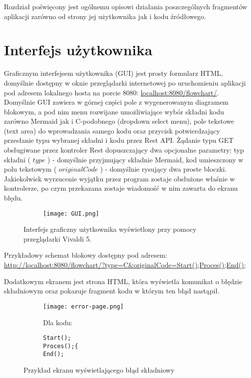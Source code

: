 	Rozdział poświęcony jest ogólnemu opisowi działania poszczególnych fragmentów aplikacji zarówno od strony jej użytkownika jak i kodu źródłowego.

\section{Interfejs użytkownika}
	Graficznym interfejsem użytkownika (GUI) jest prosty formularz HTML, domyślnie dostępny w oknie przeglądarki internetowej po uruchomieniu aplikacji pod adresem lokalnego hosta na porcie 8080: 
	\smallbreak
	\href{http://localhost:8080/flowchart/}{localhost:8080/flowchart/}.
	\bigbreak	
	Domyślnie GUI zawiera w górnej części pole z wygenerowanym diagramem blokowym, a pod nim  menu rozwijane umożliwiające wybór składni kodu zarówno Mermaid jak i C-podobnego (dropdown select menu), pole tekstowe (text area) do wprowadzania samego kodu oraz przycisk potwierdzający przesłanie typu wybranej składni i kodu przez Rest API. Żądanie typu GET obsługiwane przez kontroler Rest dopuszczający dwa opcjonalne parametry: typ składni ( $type$ ) - domyślnie przyjmujący składnie Mermaid, kod umieszczony w polu tekstowym ( $originalCode$ ) - domyślnie rysujący dwa proste bloczki. Jakiekolwiek wyrzucenie wyjątku przez program zostaje obsłużone właśnie w kontrolerze, po czym przekazana zostaje wiadomość w nim zawarta do ekranu błędu.

	
				\begin{figure}[H]
  \begin{subfigure}{\textwidth}
    \texttt{[image: GUI.png]}
  \end{subfigure}\hfill
  \caption{Interfejs graficzny użytkownika wyświetlony przy pomocy przeglądarki Vivaldi 5. }
\end{figure}

Przykładowy schemat blokowy dostępny pod adresem: 
	\smallbreak
	\href{http://localhost:8080/flowchart/?type=C\&originalCode=Start();Proces();End();}{http://localhost:8080/flowchart/?type=C\&originalCode=Start();Proces();End();}
	\bigbreak
	
	Dodatkowym ekranem jest strona HTML, która wyświetla komunikat o błędzie składniowym oraz pokazuje fragment kodu w którym ten błąd nastąpił.
	
	\begin{figure}[H]
  \begin{subfigure}{\textwidth}
    \texttt{[image: error-page.png]}
  \end{subfigure}\hfill
    \begin{subfigure}[t]{0.44\textwidth}
    \bigbreak
    Dla kodu:
    \begin{verbatim}
Start();
Proces();{
End();
    \end{verbatim}
  \end{subfigure}%
  \caption{Przykład ekranu wyświetlającego błąd składniowy}
\end{figure}


